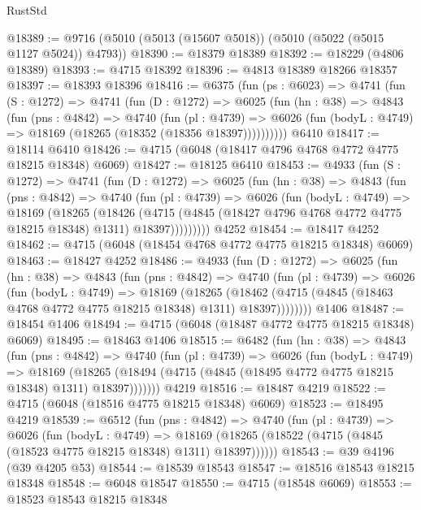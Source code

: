\begin{lexlean}{RustStd}
\begin{coremodule}
@18389 := @9716 (@5010 (@5013 (@15607 @5018)) (@5010 (@5022 (@5015 @1127 @5024)) @4793))
@18390 := @18379 @18389
@18392 := @18229 (@4806 @18389)
@18393 := @4715 @18392
@18396 := @4813 @18389 @18266 @18357
@18397 := @18393 @18396
@18416 := @6375
    (fun (ps : @6023) =>
    @4741
      (fun (S : @1272) =>
      @4741
        (fun (D : @1272) =>
        @6025
          (fun (hn : @38) =>
          @4843
            (fun (pns : @4842) =>
            @4740
              (fun (pl : @4739) =>
              @6026 (fun (bodyL : @4749) => @18169 (@18265 (@18352 (@18356 @18397))))))))))
    @6410
@18417 := @18114 @6410
@18426 := @4715 (@6048 (@18417 @4796 @4768 @4772 @4775 @18215 @18348) @6069)
@18427 := @18125 @6410
@18453 := @4933
    (fun (S : @1272) =>
    @4741
      (fun (D : @1272) =>
      @6025
        (fun (hn : @38) =>
        @4843
          (fun (pns : @4842) =>
          @4740
            (fun (pl : @4739) =>
            @6026
              (fun (bodyL : @4749) =>
              @18169
                (@18265
                  (@18426
                    (@4715
                      (@4845 (@18427 @4796 @4768 @4772 @4775 @18215 @18348) @1311)
                      @18397)))))))))
    @4252
@18454 := @18417 @4252
@18462 := @4715 (@6048 (@18454 @4768 @4772 @4775 @18215 @18348) @6069)
@18463 := @18427 @4252
@18486 := @4933
    (fun (D : @1272) =>
    @6025
      (fun (hn : @38) =>
      @4843
        (fun (pns : @4842) =>
        @4740
          (fun (pl : @4739) =>
          @6026
            (fun (bodyL : @4749) =>
            @18169
              (@18265
                (@18462 (@4715 (@4845 (@18463 @4768 @4772 @4775 @18215 @18348) @1311) @18397))))))))
    @1406
@18487 := @18454 @1406
@18494 := @4715 (@6048 (@18487 @4772 @4775 @18215 @18348) @6069)
@18495 := @18463 @1406
@18515 := @6482
    (fun (hn : @38) =>
    @4843
      (fun (pns : @4842) =>
      @4740
        (fun (pl : @4739) =>
        @6026
          (fun (bodyL : @4749) =>
          @18169
            (@18265 (@18494 (@4715 (@4845 (@18495 @4772 @4775 @18215 @18348) @1311) @18397)))))))
    @4219
@18516 := @18487 @4219
@18522 := @4715 (@6048 (@18516 @4775 @18215 @18348) @6069)
@18523 := @18495 @4219
@18539 := @6512
    (fun (pns : @4842) =>
    @4740
      (fun (pl : @4739) =>
      @6026
        (fun (bodyL : @4749) =>
        @18169 (@18265 (@18522 (@4715 (@4845 (@18523 @4775 @18215 @18348) @1311) @18397))))))
@18543 := @39 @4196 (@39 @4205 @53)
@18544 := @18539 @18543
@18547 := @18516 @18543 @18215 @18348
@18548 := @6048 @18547
@18550 := @4715 (@18548 @6069)
@18553 := @18523 @18543 @18215 @18348

\end{coremodule}
\end{lexlean}
